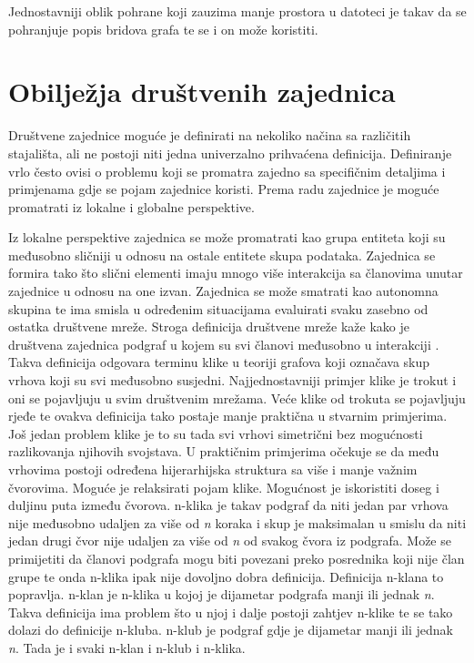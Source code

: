 Jednostavniji oblik pohrane koji zauzima manje prostora u datoteci je takav da se pohranjuje popis bridova grafa te se i on može koristiti.


\section{Obilježja društvenih zajednica} 

Društvene zajednice moguće je definirati na nekoliko načina sa različitih stajališta, ali ne postoji niti jedna univerzalno prihvaćena definicija. Definiranje vrlo često ovisi o problemu koji se promatra zajedno sa specifičnim detaljima i primjenama gdje se pojam zajednice koristi. Prema radu \cite{fortunato2010community} zajednice je moguće promatrati iz lokalne i globalne perspektive.

Iz lokalne perspektive zajednica se može promatrati kao grupa entiteta koji su međusobno sličniji u odnosu na ostale entitete skupa podataka. Zajednica se formira tako što slični elementi imaju mnogo više interakcija sa članovima unutar zajednice u odnosu na one izvan. Zajednica se može smatrati kao autonomna skupina te ima smisla u određenim situacijama evaluirati svaku zasebno od ostatka društvene mreže. Stroga definicija društvene mreže kaže kako je društvena zajednica podgraf u kojem su svi članovi međusobno u interakciji \cite{luce1949method}. Takva definicija odgovara terminu klike u teoriji grafova koji označava skup vrhova koji su svi međusobno susjedni. Najjednostavniji primjer klike je trokut i oni se pojavljuju u svim društvenim mrežama. Veće klike od trokuta se pojavljuju rjeđe te ovakva definicija tako postaje manje praktična u stvarnim primjerima. Još jedan problem klike je to su tada svi vrhovi simetrični bez mogućnosti razlikovanja njihovih svojstava. U praktičnim primjerima očekuje se da među vrhovima postoji određena hijerarhijska struktura sa više i manje važnim čvorovima. Moguće je relaksirati pojam klike. Mogućnost je iskoristiti doseg i duljinu puta između čvorova. n-klika je takav podgraf da niti jedan par vrhova nije međusobno udaljen za više od \textit{n} koraka i skup je maksimalan u smislu da niti jedan drugi čvor nije udaljen za više od \textit{n} od svakog čvora iz podgrafa. Može se primijetiti da članovi podgrafa mogu biti povezani preko posrednika koji nije član grupe te onda n-klika ipak nije dovoljno dobra definicija. Definicija n-klana to popravlja. n-klan je n-klika u kojoj je dijametar podgrafa manji ili jednak \textit{n}. Takva definicija ima problem što u njoj i dalje postoji zahtjev n-klike te se tako dolazi do definicije n-kluba. n-klub je podgraf gdje je dijametar manji ili jednak \textit{n}. Tada je i svaki n-klan i n-klub i n-klika.

